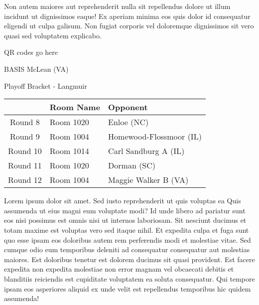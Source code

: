 \documentclass{article}%
\begin{document}
\newline%
Non autem maiores aut reprehenderit nulla sit repellendus dolore ut illum incidunt ut dignissimos eaque! Ex aperiam minima eos quis dolor id consequatur eligendi ut culpa galisum. Non fugiat corporis vel doloremque dignissimos sit vero quasi sed voluptatem explicabo.\newline%
\newline%
%
\vspace*{30pt}%
\begin{center}%
\begin{Huge}%
QR codes go here%
\end{Huge}%
\end{center}%
\newpage%
\begin{center}%
\begin{Huge}%
BASIS McLean (VA)%
\end{Huge}%
\vspace*{8pt}%
\linebreak%
\begin{Large}%
Playoff Bracket {-} Langmuir%
\end{Large}%
\end{center}%
\begin{tabularx}{\textwidth}{|c|Y|Y|}%
\hline%
&Room Name&Opponent\\%
\hline%
Round 8&Room 1020&Enloe (NC)\\%
Round 9&Room 1004&Homewood{-}Flossmoor (IL)\\%
Round 10&Room 1014&Carl Sandburg A (IL)\\%
Round 11&Room 1020&Dorman (SC)\\%
Round 12&Room 1004&Maggie Walker B (VA)\\%
\hline%
\end{tabularx}%
\vspace*{8pt}%
\linebreak%
\newline%
\newline%
Lorem ipsum dolor sit amet. Sed iusto reprehenderit ut quis voluptas ea Quis assumenda ut eius magni eum voluptate modi? Id unde libero ad pariatur sunt eos nisi possimus est omnis nisi ut internos laboriosam. Sit nesciunt ducimus et totam maxime est voluptas vero sed itaque nihil. Et expedita culpa et fuga sunt quo esse ipsam eos doloribus autem rem perferendis modi et molestiae vitae.\newline%
\newline%
Sed cumque odio eum temporibus deleniti ad consequatur consequatur aut molestias maiores. Est doloribus tenetur est dolorem ducimus sit quasi provident. Est facere expedita non expedita molestiae non error magnam vel obcaecati debitis et blanditiis reiciendis est cupiditate voluptatem ea soluta consequatur. Qui tempore ipsam eos asperiores aliquid ex unde velit est repellendus temporibus hic quidem assumenda!\newline%
\end{document}

